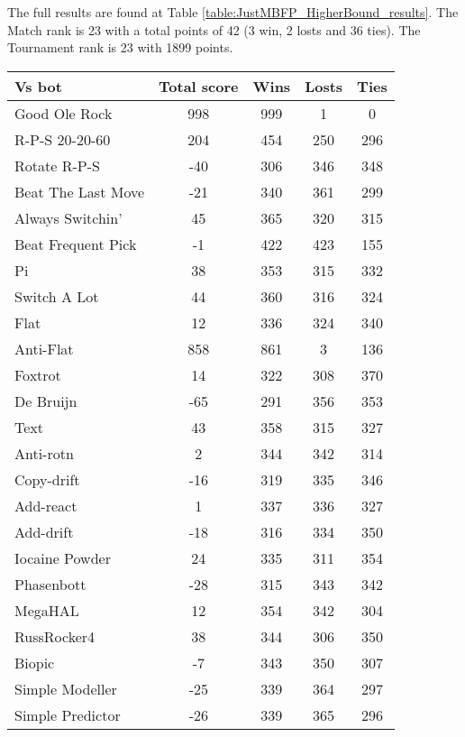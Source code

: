 The full results are found at Table \ref{table:JustMBFP_HigherBound_results}. The Match rank is 23 with a total points of 42 (3 win, 2 losts and 36 ties). The Tournament rank is 23 with 1899 points.

\begin{table*}
    \caption{JustMBFP_HigherBound results}
    \label{table:JustMBFP_HigherBound_results}
    \centering
    \begin{tabular}{|l|c|c|c|c|}
        \hline
        \textbf{Vs bot} & \textbf{Total score} & \textbf{Wins} & \textbf{Losts} & \textbf{Ties} \\ \hline
Good Ole Rock & 998 & 999 & 1 & 0 \\ \hline 
R-P-S 20-20-60 & 204 & 454 & 250 & 296 \\ \hline 
Rotate R-P-S & -40 & 306 & 346 & 348 \\ \hline 
Beat The Last Move & -21 & 340 & 361 & 299 \\ \hline 
Always Switchin' & 45 & 365 & 320 & 315 \\ \hline 
Beat Frequent Pick & -1 & 422 & 423 & 155 \\ \hline 
Pi & 38 & 353 & 315 & 332 \\ \hline 
Switch A Lot & 44 & 360 & 316 & 324 \\ \hline 
Flat & 12 & 336 & 324 & 340 \\ \hline 
Anti-Flat & 858 & 861 & 3 & 136 \\ \hline 
Foxtrot & 14 & 322 & 308 & 370 \\ \hline 
De Bruijn & -65 & 291 & 356 & 353 \\ \hline 
Text & 43 & 358 & 315 & 327 \\ \hline 
Anti-rotn & 2 & 344 & 342 & 314 \\ \hline 
Copy-drift & -16 & 319 & 335 & 346 \\ \hline 
Add-react & 1 & 337 & 336 & 327 \\ \hline 
Add-drift & -18 & 316 & 334 & 350 \\ \hline 
Iocaine Powder & 24 & 335 & 311 & 354 \\ \hline 
Phasenbott & -28 & 315 & 343 & 342 \\ \hline 
MegaHAL & 12 & 354 & 342 & 304 \\ \hline 
RussRocker4 & 38 & 344 & 306 & 350 \\ \hline 
Biopic & -7 & 343 & 350 & 307 \\ \hline 
Simple Modeller & -25 & 339 & 364 & 297 \\ \hline 
Simple Predictor & -26 & 339 & 365 & 296 \\ \hline 

\end{tabular}
\end{table*}
